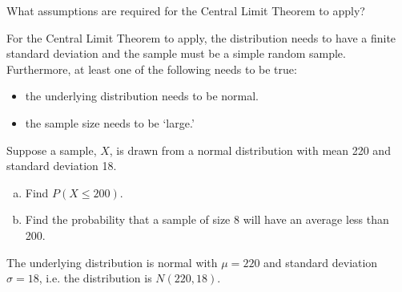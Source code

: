 \documentclass[11pt,letterpaper]{article}
\begin{document}

 What assumptions are required for the Central Limit Theorem to apply? \pspace

\sol For the Central Limit Theorem to apply, the distribution needs to have a finite standard deviation and the sample must be a simple random sample. Furthermore, at least one of the following needs to be true:
	\begin{itemize}
	\item the underlying distribution needs to be normal.
	\item the sample size needs to be `large.' 
	\end{itemize}



\newpage



 Suppose a sample, $X$, is drawn from a normal distribution with mean 220 and standard deviation 18. 
	\begin{enumerate}[(a)]
	\item Find $P(X \leq 200)$. 
	\item Find the probability that a sample of size 8 will have an average less than 200. 
	\end{enumerate} \pspace

\sol The underlying distribution is normal with $\mu= 220$ and standard deviation $\sigma= 18$, i.e. the distribution is $N(220, 18)$. 
\end{document}
